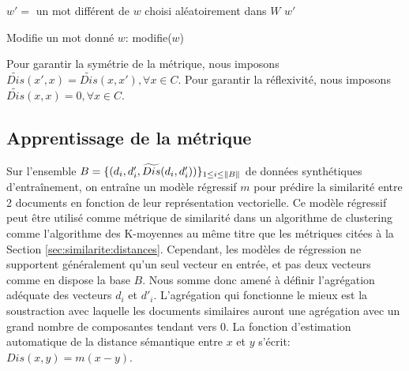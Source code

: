 \begin{algorithm}[H]
 $w' = $ un mot différent de $w$ choisi aléatoirement dans $W$\;
 \Return $w'$
 \caption{Modifie un mot donné $w$: modifie($w$)} \label{algo:similarite:modifiemot}
\end{algorithm}

Pour garantir la symétrie de la métrique, nous imposons $\widetilde{Dis}(x', x) = \widetilde{Dis}(x, x'), \forall x \in C$. Pour garantir la réflexivité, nous imposons $\widetilde{Dis}(x, x) = 0, \forall x \in C$.

\subsection{Apprentissage de la métrique}

Sur l'ensemble $B = \lbrace (d_i, d'_i, \widetilde{Dis}(d_i, d'_i))\rbrace_{1 \leq i \leq \left\lVert B\right\rVert}$ de données synthétiques d'entraînement, on entraîne un modèle régressif $m$ pour prédire la similarité entre 2 documents en fonction de leur représentation vectorielle. Ce modèle régressif peut être utilisé comme métrique de similarité dans un algorithme de clustering comme l'algorithme des K-moyennes au même titre que les métriques citées à la Section \ref{sec:similarite:distances}. Cependant, les modèles de régression ne supportent généralement qu'un seul vecteur en entrée, et pas deux vecteurs comme en dispose la base $B$. Nous somme donc amené à définir l'agrégation adéquate des vecteurs $d_i$ et $d'_i$. L'agrégation qui fonctionne le mieux est la soustraction avec laquelle les documents similaires auront une agrégation avec un grand nombre de composantes tendant vers 0. La fonction d'estimation automatique de la distance sémantique entre $x$ et $y$ s'écrit: $Dis(x, y) = m(x-y)$. 

